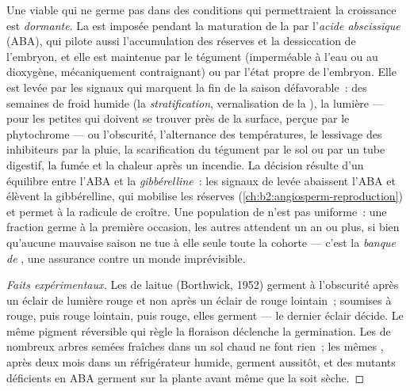 \begin{definition}\label{def:b2:plant-flowering:dormancy}
Une  viable qui ne germe pas dans des conditions qui
permettraient la croissance est \emph{dormante}. La  est
imposée pendant la maturation de la  par l'\emph{acide
abscissique} (ABA), qui pilote aussi l'accumulation des réserves et la
dessiccation de l'embryon, et elle est maintenue par le tégument
(imperméable à l'eau ou au dioxygène, mécaniquement contraignant) ou par
l'état propre de l'embryon. Elle est levée par les signaux qui marquent
la fin de la saison défavorable~: des semaines de froid humide (la
\emph{stratification}, vernalisation de la ), la lumière ---
pour les petites  qui doivent se trouver près de la surface,
perçue par le phytochrome --- ou l'obscurité, l'alternance des
températures, le lessivage des inhibiteurs par la pluie, la
scarification du tégument par le sol ou par un tube digestif, la fumée
et la chaleur après un incendie. La décision résulte d'un équilibre
entre l'ABA et la \emph{gibbérelline}~: les signaux de levée abaissent
l'ABA et élèvent la gibbérelline, qui mobilise les réserves
(\cref{ch:b2:angiosperm-reproduction}) et permet à la radicule de
croître. Une population de  n'est pas uniforme~: une fraction
germe à la première occasion, les autres attendent un an ou plus, si
bien qu'aucune mauvaise saison ne tue à elle seule toute la cohorte ---
c'est la \emph{banque de }, une assurance contre un monde
imprévisible.
\end{definition}
\begin{proof}[Faits expérimentaux]
Les  de laitue (Borthwick, 1952) germent à l'obscurité après un
éclair de lumière rouge et non après un éclair de rouge lointain~;
soumises à rouge, puis rouge lointain, puis rouge, elles germent --- le
dernier éclair décide. Le même pigment réversible qui règle la
floraison déclenche la germination. Les  de nombreux arbres
semées fraîches dans un sol chaud ne font rien~; les mêmes , après
deux mois dans un réfrigérateur humide, germent aussitôt, et des mutants
déficients en ABA germent sur la plante avant même que la  soit
sèche.
\end{proof}

